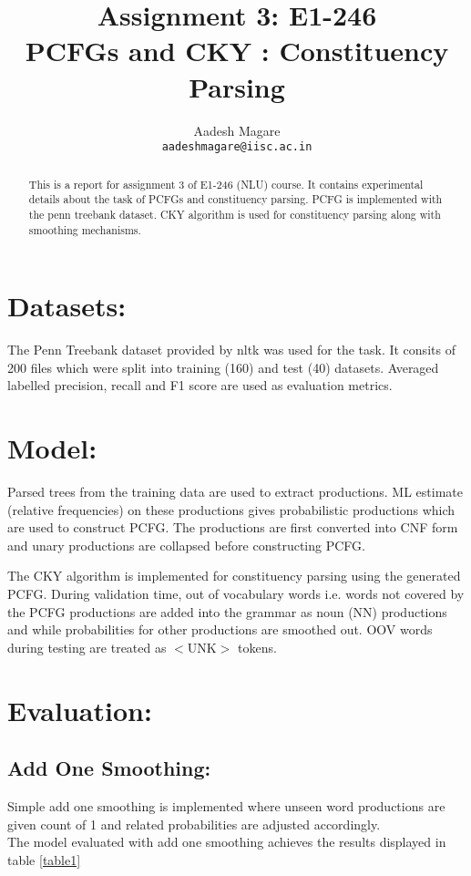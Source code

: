 \documentclass[11pt,a4paper]{article}
\title{Assignment 3: E1-246 \\
    PCFGs and CKY : Constituency Parsing 
        }
\author{Aadesh Magare\\
  \texttt{aadeshmagare@iisc.ac.in}
  }
\date{}
\begin{document}
\maketitle
\begin{abstract}
    This is a report for assignment 3 of E1-246 (NLU) course. It contains experimental details about the task of PCFGs and constituency parsing. PCFG is implemented with the penn treebank dataset.
 CKY algorithm is used for constituency parsing along with smoothing mechanisms.
 
\end{abstract}


\section{Datasets:}
The Penn Treebank dataset provided by nltk \cite{PennTreebank} was used for the task. It consits of 200 files which were split into training (160) and test (40) datasets. Averaged labelled precision, recall and F1 score are used as evaluation metrics. 

\section{Model:}
Parsed trees from the training data are used to extract productions. ML estimate (relative frequencies) on these productions gives probabilistic productions which are used to construct PCFG.
The productions are first converted into CNF \cite{CNF} form and unary productions are collapsed before constructing PCFG.

The CKY algorithm \cite{CKY} is implemented for constituency parsing using the generated PCFG. During validation time, out of vocabulary words i.e. words not covered by the PCFG productions are added into the grammar as noun (NN) productions and while probabilities for other productions are smoothed out. OOV words during testing are treated as $<$UNK$>$ tokens.

\section{Evaluation:}
\subsection{Add One Smoothing:}
Simple add one smoothing is implemented where unseen word productions are given count of 1 and related probabilities are adjusted accordingly.\\
The model evaluated with add one smoothing achieves the results displayed in table \ref{table1}
\end{document}
